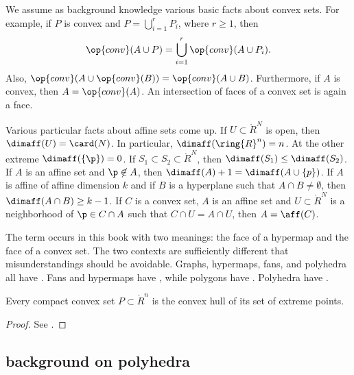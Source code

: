 \begin{remark}\label{rem:convex-background}
We  assume as background knowledge various basic facts about convex sets.
For example,
if $P$ is convex and $P = \bigcup_{i=1}^r P_i$, where $r\ge 1$, then
\[ 
\op{conv}(A\cup P ) = \bigcup_{i=1}^r\op{conv}(A\cup P_i).
\] 
Also, $\op{conv}(A\cup \op{conv}(B)) = \op{conv}(A \cup B)$.
Furthermore, if $A$ is convex, then $A = \op{conv}(A)$.
 An intersection of faces of a
convex set is again a face.
\end{remark}


\begin{remark}\label{rem:affine-background}
Various particular facts about affine sets  come up.
If $U\subset\ring{R}^N$ is open, then $\dimaff(U) = \card(N)$.  In particular,
$\dimaff(\ring{R}^n) = n$.  At the other extreme $\dimaff(\{\p\}) = 0$.
If $S_1\subset S_2\subset\ring{R}^N$, then $\dimaff(S_1) \le \dimaff(S_2)$.
If $A$ is an affine set and $\p\not\in A$, then $\dimaff(A) +1 = \dimaff(A\cup\{p\})$.
If $A$ is affine of affine dimension $k$ and if $B$ is a hyperplane such that $A\cap B\ne\emptyset$, then $\dimaff (A\cap B)\ge k-1$.
If $C$ is a convex set, $A$ is an affine set and $U\subset \ring{R}^N$ 
is a neighborhood of $\p\in C\cap A$ such that $C\cap U = A\cap U$, then
$A=\aff(C)$.
\end{remark}


\begin{remark}[polysemes]\label{remark:face} 
The term  occurs in this book with two meanings: the
face of a hypermap and the face of a convex set.  The two contexts
are sufficiently different that  misunderstandings should be avoidable.
Graphs,  hypermaps, fans, and polyhedra all have .
Fans and hypermaps have , while polygons 
have .  Polyhedra have .
\end{remark}

\begin{lemma} Every compact
convex set $P\subset\ring{R}^n$ is the convex hull of its set of
extreme points.
\end{lemma}

\begin{proof}  See \cite[Theorem~2.6.16]{webster:1994}.
\end{proof}

\subsection{background on polyhedra}


